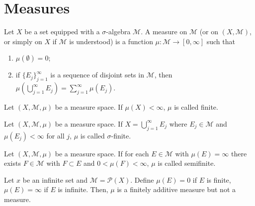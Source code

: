 \section{Measures}

\begin{definition}[Measure]
    Let $X$ be a set equipped with a $\sigma$-algebra $\mathcal{M}$.
    A measure on $\mathcal{M}$ (or on $(X, \mathcal{M})$, or simply on $X$ if $\mathcal{M}$ is understood) is a function $\mu: \mathcal{M} \to [0, \infty]$ such that
    \begin{enumerate}
        \item $\mu(\emptyset) = 0$;
        \item if $\{ E_j \}_{j=1}^{\infty}$ is a sequence of disjoint sets in $\mathcal{M}$, then $\mu(\bigcup_{j=1}^{\infty} E_j) = \sum _{j=1}^{\infty} \mu(E_j)$.
    \end{enumerate}
\end{definition}

\begin{definition}
    Let $(X, \mathcal{M}, \mu)$ be a measure space.
    If $\mu(X) < \infty$, $\mu$ is called finite.
\end{definition}

\begin{definition}
    Let $(X, \mathcal{M}, \mu)$ be a measure space.
    If $X = \bigcup_{j=1}^{\infty} E_j$ where $E_j \in \mathcal{M}$ and $\mu(E_j) < \infty$ for all $j$, $\mu$ is called $\sigma$-finite.
\end{definition}

\begin{definition}
    Let $(X, \mathcal{M}, \mu)$ be a measure space.
    If for each $E \in \mathcal{M}$ with $\mu(E) = \infty$ there exists $F \in \mathcal{M}$ with $F \subset E$ and $0 < \mu(F) < \infty$, $\mu$ is called semifinite.
\end{definition}

\begin{example}
    Let $x$ be an infinite set and $\mathcal{M} = \mathcal{P}(X)$.
    Define $\mu(E) = 0$ if $E$ is finite, $\mu(E) = \infty$ if $E$ is infinite.
    Then, $\mu$ is a finitely additive measure but not a measure.
\end{example}

